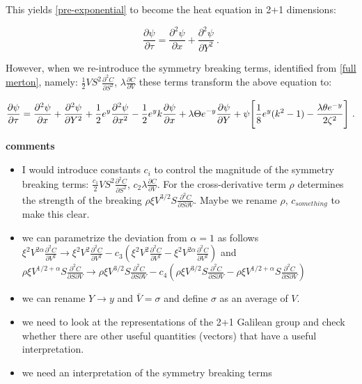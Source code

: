\documentclass[english,12pt]{article}
\def\to{\rightarrow}
\begin{document}
This yields \ref{pre-exponential} to become the heat equation in 2+1 dimensions:


\begin{equation}
\frac{\partial \psi}{\partial \tau} = \frac{\partial^2 \psi}{\partial x} + \frac{\partial^2 \psi}{\partial Y^2}~.
\end{equation}





However, when we re-introduce the symmetry breaking terms, identified from \ref{full merton}, namely: $\frac{1}{2} V S^2 \frac{\partial^2 C}{\partial S^2}$,  $\lambda \frac{\partial C}{\partial V} $ these terms transform the above equation to: 

\begin{equation}
\frac{\partial \psi}{\partial \tau} = \frac{\partial^2 \psi}{\partial x} + \frac{\partial^2 \psi}{\partial Y^2} + \frac{1}{2}e^{y}\frac{\partial^2 \psi}{\partial x^2} -\frac{1}{2}e^{y}k\frac{\partial \psi}{\partial x} + \lambda\Theta e^{-y}\frac{\partial\psi}{\partial Y} + \psi \Bigg{[} \frac{1}{8}e^{y}(k^{2} - 1) - \frac{\lambda\theta e^{-y}}{2\zeta^{2}} \Bigg{]}~.
\end{equation}



{\bf comments}

\begin{itemize}
\item I would introduce constants $c_i$ to control the magnitude of the symmetry breaking terms:
$\frac{c_1}{2} V S^2 \frac{\partial^2 C}{\partial S^2}$, $c_2 \lambda \frac{\partial C}{\partial V}$. For the cross-derivative term $\rho$ determines the strength of the breaking $\rho \xi V^{3/2} S \frac{\partial^2 C}{\partial S \partial V}$. Maybe we rename $\rho$, $c_{something}$ to make this clear.
\item we can parametrize the deviation from $\alpha=1$ as follows
$\xi^2 V^{2 \alpha}  \frac{\partial^2 C}{\partial V^2}\to\xi^2 V^{2}  \frac{\partial^2 C}{\partial V^2}- c_3 (\xi^2 V^{2}  \frac{\partial^2 C}{\partial V^2}-\xi^2 V^{2 \alpha}  \frac{\partial^2 C}{\partial V^2}) $ and $\rho \xi V^{1/2+\alpha} S \frac{\partial^2 C}{\partial S \partial V}\to \rho \xi V^{3/2} S \frac{\partial^2 C}{\partial S \partial V} 
- c_4(\rho \xi V^{3/2} S \frac{\partial^2 C}{\partial S \partial V} -
\rho \xi V^{1/2+\alpha} S \frac{\partial^2 C}{\partial S \partial V}) $ 
\item we can rename $Y\to y$ and $\bar V=\sigma$ and define $\sigma$ as an average of $V$.
\item we need to look at the representations of the 2+1 Galilean group and check whether there are other useful quantities (vectors) that have a useful interpretation.
\item we need an interpretation of the symmetry breaking terms
\end{itemize}
\end{document}
